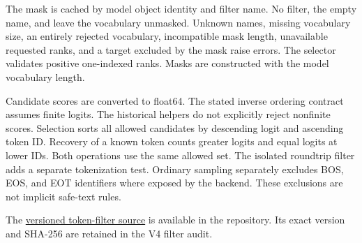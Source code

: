 The mask is cached by model object identity and filter name. No filter, the empty name, and  leave the vocabulary unmasked. Unknown names, missing vocabulary size, an entirely rejected vocabulary, incompatible mask length, unavailable requested ranks, and a target excluded by the mask raise errors. The selector validates positive one-indexed ranks. Masks are constructed with the model vocabulary length.

Candidate scores are converted to float64. The stated inverse ordering contract assumes finite logits. The historical helpers do not explicitly reject nonfinite scores. Selection sorts all allowed candidates by descending logit and ascending token ID. Recovery of a known token counts greater logits and equal logits at lower IDs. Both operations use the same allowed set. The isolated roundtrip filter adds a separate tokenization test. Ordinary sampling separately excludes BOS, EOS, and EOT identifiers where exposed by the backend. These exclusions are not implicit safe-text rules.

The \href{https://github.com/mantzaris/llm-rankcloak/blob/60d23fffe5962d4e0b652fa045d762ca10bc3dcc/rankcloak/token_filters.py}{versioned token-filter source} is available in the repository. Its exact version and SHA-256 are retained in the V4 filter audit.
